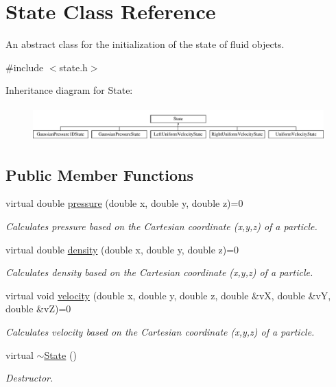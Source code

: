 \hypertarget{classState}{\section{State Class Reference}
\label{classState}
}


An abstract class for the initialization of the state of fluid objects.  




{\ttfamily \#include $<$state.\-h$>$}

Inheritance diagram for State\-:\begin{figure}[H]
\begin{center}
\leavevmode
\includegraphics[height=1.341317cm]{classState}
\end{center}
\end{figure}
\subsection*{Public Member Functions}
\begin{DoxyCompactItemize}
\item 
virtual double \hyperlink{classState_a74bb463fe066c9b35b33749afdd96360}{pressure} (double x, double y, double z)=0
\begin{DoxyCompactList}\small\item\em Calculates pressure based on the Cartesian coordinate (x,y,z) of a particle. \end{DoxyCompactList}\item 
virtual double \hyperlink{classState_a965fc353153650d94641b3f6dc04f761}{density} (double x, double y, double z)=0
\begin{DoxyCompactList}\small\item\em Calculates density based on the Cartesian coordinate (x,y,z) of a particle. \end{DoxyCompactList}\item 
virtual void \hyperlink{classState_a74515cbbfe947e2a8df9c85f06a845e4}{velocity} (double x, double y, double z, double \&v\-X, double \&v\-Y, double \&v\-Z)=0
\begin{DoxyCompactList}\small\item\em Calculates velocity based on the Cartesian coordinate (x,y,z) of a particle. \end{DoxyCompactList}\item 
\hypertarget{classState_a9ddc1df6f998184d6477b48fab90281c}{virtual \hyperlink{classState_a9ddc1df6f998184d6477b48fab90281c}{$\sim$\-State} ()}\label{classState_a9ddc1df6f998184d6477b48fab90281c}

\begin{DoxyCompactList}\small\item\em Destructor. \end{DoxyCompactList}\end{DoxyCompactItemize}


